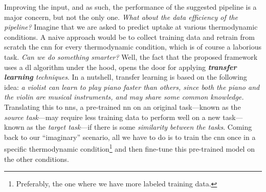 Improving the input, and as such, the performance of the suggested pipeline is a
major concern, but not the only one. \emph{What about the data
efficiency of the pipeline?} Imagine that we are asked to
predict  uptake at various thermodynamic conditions. A naive approach would be to collect training data and retrain from scratch the \gls{cnn} for every thermodynamic condition,
which is of course a laborious task. \emph{Can we do something smarter?} Well,
the fact that the proposed framework uses a \gls{dl} algorithm under the hood, opens the door for applying
\emph{\textbf{transfer learning} techniques}.  In a
nutshell, transfer learning\parencite{Zhuang2019, Ma2020, Kang2023} is based on
the following idea: \emph{a violist can learn to play piano faster than others,
since both the piano and the violin are musical instruments, and may share some
common knowledge.} Translating this to \glspl{nn}, a pre-trained \gls{nn} on an
original task---known as the \emph{source task}---may require
less training data to perform well on a new task---known as the \emph{target
task}---if there is some \emph{similarity between the tasks}.
Coming back to our ``imaginary'' scenario, all we have to do is to train the
\gls{cnn} once in a specific thermodynamic condition\footnote{Preferably, the
one where we have more labeled training data.} and then
fine-tune this pre-trained model on
the other conditions.

